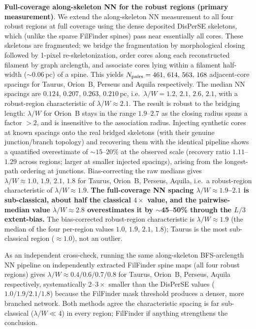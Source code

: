 \documentclass[usenatbib,twoside,twocolumn]{mnras}
\begin{document}
\textbf{Full-coverage along-skeleton NN for the robust regions (primary measurement)}. We extend the along-skeleton NN measurement to all four robust regions at full coverage using the dense deposited DisPerSE skeletons, which (unlike the sparse FilFinder spines) pass near essentially all cores. These skeletons are fragmented; we bridge the fragmentation by morphological closing followed by 1-pixel re-skeletonization, order cores along each reconstructed filament by graph arclength, and associate cores lying within a filament half-width ($\sim$0.06\,pc) of a spine. This yields $N_{\rm pairs} = 461,\,614,\,563,\,168$ adjacent-core spacings for Taurus, Orion~B, Perseus and Aquila respectively. The median NN spacings are $0.124,\,0.207,\,0.263,\,0.210$\,pc, i.e.\ $\lambda/W = 1.2,\,2.1,\,2.6,\,2.1$, with a robust-region characteristic of $\lambda/W \approx 2.1$. The result is robust to the bridging length: $\lambda/W$ for Orion~B stays in the range $1.9$--$2.7$ as the closing radius spans a factor $>2$, and is insensitive to the association radius. Injecting synthetic cores at known spacings onto the real bridged skeletons (with their genuine junction/branch topology) and recovering them with the identical pipeline shows a quantified overestimate of $\sim$$15$--$20$\% at the observed scale (recovery ratio $1.11$--$1.29$ across regions; larger at smaller injected spacings), arising from the longest-path ordering at junctions. Bias-correcting the raw medians gives $\lambda/W \approx 1.0,\,1.9,\,2.1,\,1.8$ for Taurus, Orion~B, Perseus, Aquila, i.e.\ a robust-region characteristic of $\lambda/W \approx 1.9$. \textbf{The full-coverage NN spacing $\lambda/W \approx 1.9$--$2.1$ is sub-classical, about half the classical $4\times$ value, and the pairwise-median value $\lambda/W \approx 2.8$ overestimates it by $\sim$45--50\% through the $L/3$ extent-bias.} The bias-corrected robust-region characteristic is $\lambda/W\approx1.9$ (the median of the four per-region values $1.0,\,1.9,\,2.1,\,1.8$); Taurus is the most sub-classical region ($\approx1.0$), not an outlier.

As an independent cross-check, running the same along-skeleton BFS-arclength NN pipeline on independently extracted FilFinder spine maps (all four robust regions) gives $\lambda/W\approx0.4/0.6/0.7/0.8$ for Taurus, Orion~B, Perseus, Aquila respectively, systematically $2$--$3\times$ smaller than the DisPerSE values ($1.0/1.9/2.1/1.8$) because the FilFinder mask threshold produces a denser, more branched network. Both methods agree the characteristic spacing is far sub-classical ($\lambda/W\ll4$) in every region; FilFinder if anything strengthens the conclusion.
\end{document}
